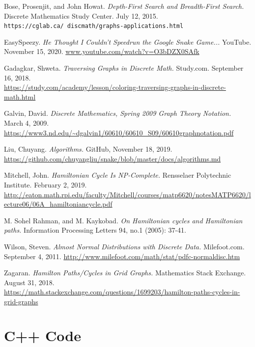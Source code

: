 \documentclass[12pt]{article}
\begin{document}
\pagebreak
\begin{thebibliography}{9}
Bose, Prosenjit, and John Howat. \textit{Depth-First Search and Breadth-First Search.} Discrete Mathematics Study Center. July 12, 2015. \\\texttt{https://cglab.ca/~discmath/graphs-applications.html}

EasySpeezy. \textit{He Thought I Couldn't Speedrun the Google Snake Game...} YouTube. November 15, 2020. \url{www.youtube.com/watch?v=O3bDZX0SAfk}

Gadagkar, Shweta. \textit{Traversing Graphs in Discrete Math.} Study.com. September 16, 2018. \\\url{https://study.com/academy/lesson/coloring-traversing-graphs-in-discrete-math.html}

Galvin, David. \textit{Discrete Mathematics, Spring 2009 Graph Theory Notation.} March 4, 2009. \url{https://www3.nd.edu/~dgalvin1/60610/60610_S09/60610graphnotation.pdf}

Liu, Chuyang. \textit{Algorithms.} GitHub, November 18, 2019. \\\url{https://github.com/chuyangliu/snake/blob/master/docs/algorithms.md}

Mitchell, John. \textit{Hamiltonian Cycle Is NP-Complete.} Rensselaer Polytechnic Institute. February 2, 2019. \\\url{http://eaton.math.rpi.edu/faculty/Mitchell/courses/matp6620/notesMATP6620/lecture06/06A_hamiltoniancycle.pdf}

M. Sohel Rahman, and M. Kaykobad. \textit{On Hamiltonian cycles and Hamiltonian paths.} Information Processing Letters 94, no.1 (2005): 37-41.

Wilson, Steven. \textit{Almost Normal Distributions with Discrete Data.} Milefoot.com. September 4, 2011. \url{http://www.milefoot.com/math/stat/pdfc-normaldisc.htm}

Zagaran. \textit{Hamilton Paths/Cycles in Grid Graphs.} Mathematics Stack Exchange. August 31, 2018. \\\url{https://math.stackexchange.com/questions/1699203/hamilton-paths-cycles-in-grid-graphs}
\end{thebibliography}
\pagebreak
\appendix
\section{C++ Code}\label{sec:appendix_code}
\end{document}

